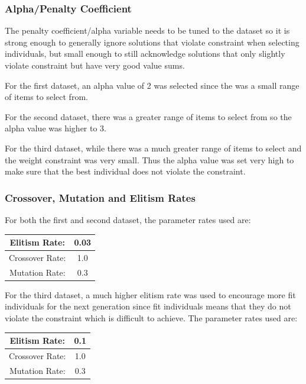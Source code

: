 \documentclass{article}
\begin{document}
\subsubsection*{Alpha/Penalty Coefficient}
The penalty coefficient/alpha variable needs to be tuned to the dataset so it is strong enough to generally ignore solutions that violate constraint when selecting individuals, but small enough to still acknowledge solutions that only slightly violate constraint but have very good value sums. \par
\noindent For the first dataset, an alpha value of 2 was selected since the was a small range of items to select from. \par
\noindent For the second dataset, there was a greater range of items to select from so the alpha value was higher to 3. \par
\noindent For the third dataset, while there was a much greater range of items to select and the weight constraint was very small. Thus the alpha value was set very high to make sure that the best individual does not violate the constraint. \par
\subsubsection*{Crossover, Mutation and Elitism Rates}
For both the first and second dataset, the parameter rates used are: 
\begin{center}
\begin{tabular}{|c|c|}
	\hline
	Elitism Rate: & 0.03 \\
	\hline
	Crossover Rate: & 1.0 \\
	\hline
	Mutation Rate: & 0.3 \\
	\hline
\end{tabular}
\end{center}
For the third dataset, a much higher elitism rate was used to encourage more fit individuals for the next generation since fit individuals means that they do not violate the constraint which is difficult to achieve. The parameter rates used are:
\begin{center}
\begin{tabular}{|c|c|}
	\hline
	Elitism Rate: & 0.1 \\
	\hline
	Crossover Rate: & 1.0 \\
	\hline
	Mutation Rate:	& 0.3 \\
	\hline
\end{tabular}
\end{center}
\end{document}
